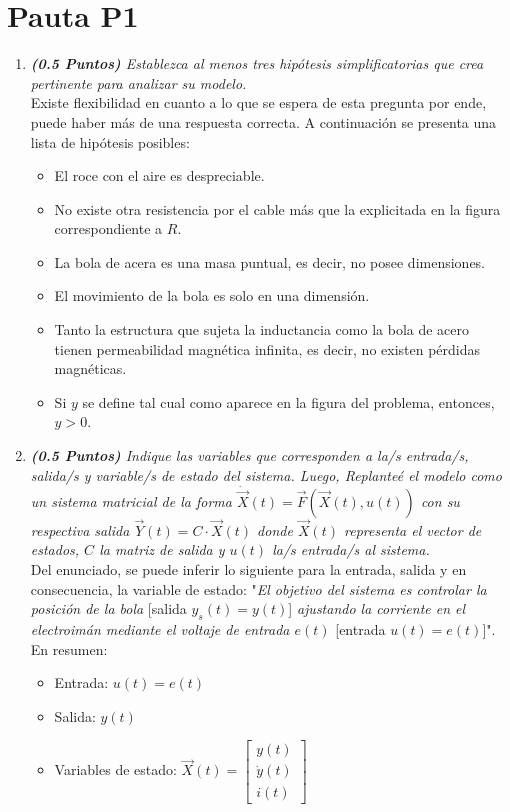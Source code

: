 \section{Pauta P1}
\begin{enumerate}
    \item \textit{\textbf{(0.5 Puntos)} Establezca al menos tres hipótesis simplificatorias que crea pertinente para analizar su modelo.}\\
    Existe flexibilidad en cuanto a lo que se espera de esta pregunta por ende, puede haber más de una respuesta correcta. A continuación se presenta una lista de hipótesis posibles:
    \begin{itemize}
        \item El roce con el aire es despreciable.
        \item No existe otra resistencia por el cable más que la explicitada en la figura correspondiente a $R$.
        \item La bola de acera es una masa puntual, es decir, no posee dimensiones.
        \item El movimiento de la bola es solo en una dimensión.
        \item Tanto la estructura que sujeta la inductancia como la bola de acero tienen permeabilidad magnética infinita, es decir, no existen pérdidas magnéticas.
        \item Si $y$ se define tal cual como aparece en la figura del problema, entonces, $y>0$.
    \end{itemize}
    \item \textit{\textbf{(0.5 Puntos)} Indique las variables que corresponden a la/s entrada/s, salida/s y variable/s de estado del sistema. Luego, Replanteé el modelo como un sistema matricial de la forma $\dot{\Vec{X}}(t)=\Vec{F}(\Vec{X}(t), u(t))$
    con su respectiva salida $\Vec{Y}(t) = C\cdot\Vec{X}(t)$
    donde $\Vec{X}(t)$ representa el vector de estados, $C$ la matriz de salida y $u(t)$ la/s entrada/s al sistema.}\\
    
    Del enunciado, se puede inferir lo siguiente para la entrada, salida y en consecuencia, la variable de estado: "\textit{El objetivo del sistema es controlar
la posición de la bola} [salida $y_s(t) = y(t)$] \textit{ajustando la corriente en el electroimán mediante el voltaje de entrada
$e(t)$} [entrada $u(t) = e(t)$]". En resumen:
    \begin{itemize}
    \item Entrada: $u(t) = e(t)$
    \item Salida: $y(t)$
    \item Variables de estado: $\Vec{X}(t) = \begin{bmatrix} y(t) \\ \dot{y}(t) \\ i(t) \end{bmatrix}$
\end{itemize}


\end{enumerate}
